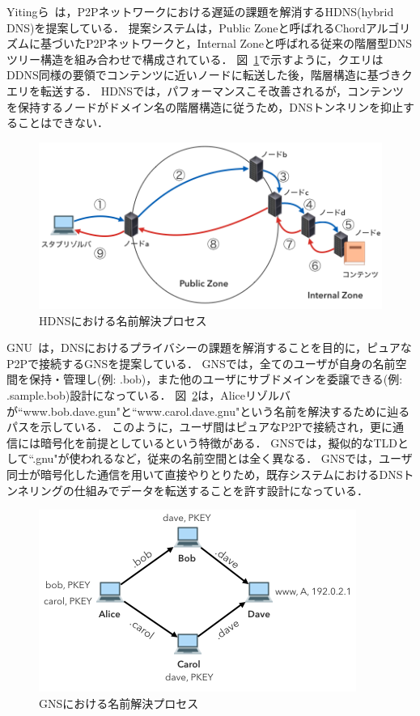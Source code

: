 Yitingら~\cite{yiting}は，P2Pネットワークにおける遅延の課題を解消するHDNS(hybrid DNS)を提案している．
提案システムは，Public Zoneと呼ばれるChordアルゴリズムに基づいたP2Pネットワークと，Internal Zoneと呼ばれる従来の階層型DNSツリー構造を組み合わせで構成されている．
図~\ref{fig:hdns-mechanism}で示すように，クエリはDDNS同様の要領でコンテンツに近いノードに転送した後，階層構造に基づきクエリを転送する．
HDNSでは，パフォーマンスこそ改善されるが，コンテンツを保持するノードがドメイン名の階層構造に従うため，DNSトンネリンを抑止することはできない．
\begin{figure}[htbp]
 \centering
 \label{fig:hdns-mechanism}
 \includegraphics[scale=0.6]{figure/hdns-mechanism.png}
 \caption{HDNSにおける名前解決プロセス}
\end{figure}

GNU~\cite{gns}は，DNSにおけるプライバシーの課題を解消することを目的に，ピュアなP2Pで接続するGNSを提案している．
GNSでは，全てのユーザが自身の名前空間を保持・管理し(例: .bob)，また他のユーザにサブドメインを委譲できる(例: .sample.bob)設計になっている．
図~\ref{fig:gns-resolution}は，Aliceリゾルバが``www.bob.dave.gun"と``www.carol.dave.gnu"という名前を解決するために辿るパスを示している．
このように，ユーザ間はピュアなP2Pで接続され，更に通信には暗号化を前提としているという特徴がある．
GNSでは，擬似的なTLDとして``.gnu"が使われるなど，従来の名前空間とは全く異なる．
GNSでは，ユーザ同士が暗号化した通信を用いて直接やりとりため，既存システムにおけるDNSトンネリングの仕組みでデータを転送することを許す設計になっている．
\begin{figure}[htbp]
 \centering
 \label{fig:gns-resolution}
 \includegraphics[scale=0.6]{figure/gns-resolution.png}
 \caption{GNSにおける名前解決プロセス}
\end{figure}

